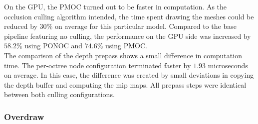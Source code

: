 \clearpage

\noindent
On the \ac{GPU}, the \ac{PMOC} turned out to be faster in computation. As the occlusion culling algorithm 
intended, the time spent drawing the meshes could be reduced by $30\%$ on average for this particular model. 
Compared to the base pipeline featuring no culling, the performance on the \ac{GPU} side was increased by 
$58.2 \%$ using \ac{PONOC} and $74.6\%$ using \ac{PMOC}. \\

\noindent
The comparison of the depth prepass shows a small difference in computation time. The per-octree node configuration 
terminated faster by $1.93$ microseconds on average. In this case, the difference was created by small deviations in 
copying the depth buffer and computing the mip maps. All prepass steps were identical between both culling 
configurations.

\subsubsection*{Overdraw}

